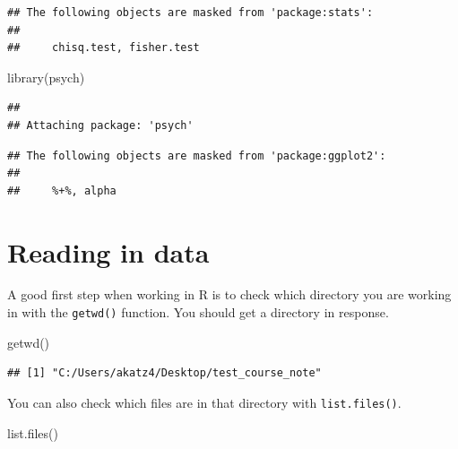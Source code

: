 \documentclass[
]{book}
\newenvironment{Shaded}{\begin{snugshade}}{\end{snugshade}}
\newcommand{\FunctionTok}[1]{\textcolor[rgb]{0.00,0.00,0.00}{#1}}
\newcommand{\NormalTok}[1]{#1}
\begin{document}
\begin{verbatim}
## The following objects are masked from 'package:stats':
## 
##     chisq.test, fisher.test
\end{verbatim}

\begin{Shaded}
\begin{Highlighting}[]
\FunctionTok{library}\NormalTok{(psych)}
\end{Highlighting}
\end{Shaded}

\begin{verbatim}
## 
## Attaching package: 'psych'
\end{verbatim}

\begin{verbatim}
## The following objects are masked from 'package:ggplot2':
## 
##     %+%, alpha
\end{verbatim}

\hypertarget{reading-in-data}{%
\section{Reading in data}\label{reading-in-data}}

A good first step when working in R is to check which directory you are working in with the \texttt{getwd()} function. You should get a directory in response.

\begin{Shaded}
\begin{Highlighting}[]
\FunctionTok{getwd}\NormalTok{()}
\end{Highlighting}
\end{Shaded}

\begin{verbatim}
## [1] "C:/Users/akatz4/Desktop/test_course_note"
\end{verbatim}

You can also check which files are in that directory with \texttt{list.files()}.

\begin{Shaded}
\begin{Highlighting}[]
\FunctionTok{list.files}\NormalTok{()}
\end{Highlighting}
\end{Shaded}
\end{document}
